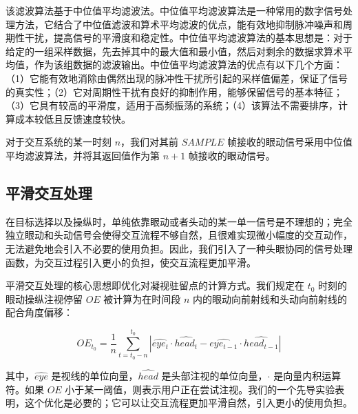 该滤波算法基于中位值平均滤波法。中位值平均滤波算法是一种常用的数字信号处理方法，它结合了中位值滤波和算术平均滤波的优点，能有效地抑制脉冲噪声和周期性干扰，提高信号的平滑度和稳定性。中位值平均滤波算法的基本思想是：对于给定的一组采样数据，先去掉其中的最大值和最小值，然后对剩余的数据求算术平均值，作为该组数据的滤波输出。中位值平均滤波算法的优点有以下几个方面：（1）它能有效地消除由偶然出现的脉冲性干扰所引起的采样值偏差，保证了信号的真实性；（2）它对周期性干扰有良好的抑制作用，能够保留信号的基本特征；（3）它具有较高的平滑度，适用于高频振荡的系统；（4）该算法不需要排序，计算成本较低且反馈速度较快。

对于交互系统的某一时刻 $n$，我们对其前 $SAMPLE$ 帧接收的眼动信号采用中位值平均滤波算法，并将其返回值作为第 $n + 1$ 帧接收的眼动信号。

\subsection{平滑交互处理}

在目标选择以及操纵时，单纯依靠眼动或者头动的某一单一信号是不理想的；完全独立眼动和头动信号会使得交互流程不够自然，且很难实现微小幅度的交互动作，无法避免地会引入不必要的使用负担。因此，我们引入了一种头眼协同的信号处理函数，为交互过程引入更小的负担，使交互流程更加平滑。

平滑交互处理的核心思想即优化对凝视驻留点的计算方式。我们规定在 $t_0$ 时刻的眼动操纵注视停留 $OE$ 被计算为在时间段 $n$ 内的眼动向前射线和头动向前射线的配合角度偏移：

\begin{equation}
	\label{formula-3-1}
	OE_{t_0} = \frac{1}{n} \sum_{t=t_0-n}^{t_0} \left| \hat{eye_t} \cdot \hat{head_t} - \hat{eye_{t-1}} \cdot \hat{head_{t-1}} \right|
\end{equation}

其中，$\hat{eye}$ 是视线的单位向量，$\hat{head}$ 是头部注视的单位向量，$\cdot$ 是向量内积运算符。如果 $OE$ 小于某一阈值，则表示用户正在尝试注视。我们的一个先导实验表明，这个优化是必要的；它可以让交互流程更加平滑自然，引入更小的使用负担。
